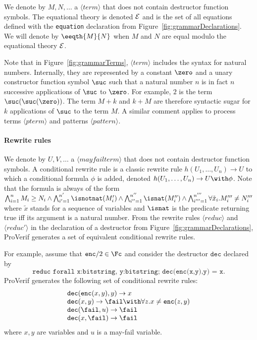 \documentclass{book}
\newcommand{\nonterm}[1]{\langle\mathit{#1}\rangle}
\begin{document}
We denote by $M,N,\ldots$ a $\nonterm{term}$ that does not contain destructor function symbols. The equational theory is denoted $\cal E$ and is the set of all equations defined with the \texttt{equation} declaration from Figure~\ref{fig:grammarDeclarations}. We will denote by $\eeqth{M}{N}$ when $M$ and $N$ are equal modulo the equational theory $\cal E$.

Note that in Figure~\ref{fig:grammarTerms}, $\nonterm{term}$ includes the syntax for natural numbers. Internally, they are represented by a constant $\zero$ and a unary constructor function symbol $\suc$ such that a natural number $n$ is in fact $n$ successive applications of $\suc$ to $\zero$. For example, $2$ is the term $\suc(\suc(\zero))$. The term $M + k$ and $k + M$ are therefore syntactic sugar for $k$ applications of $\suc$ to the term $M$.
A similar comment applies to process terms $\nonterm{pterm}$ and patterns
$\nonterm{pattern}$.

\paragraph{Rewrite rules}

We denote by $U,V,\ldots$ a $\nonterm{mayfailterm}$ that does not contain destructor function symbols. A conditional rewrite rule is a classic rewrite rule $h(U_1,\ldots, U_n) \rightarrow U$ to which a conditional formula $\phi$ is added, denoted $h(U_1,\ldots, U_n) \rightarrow U \with \phi$. Note that the formula is always of the form $\bigwedge_{i=1}^n M_i \geq N_i \wedge \bigwedge_{i'=1}^{n'} \isnotnat(M'_i) \wedge \bigwedge_{i''=1}^{n''} \isnat(M''_i) \wedge \bigwedge_{i'''=1}^{n'''} \forall \tilde{x}_i. M'''_i \neq N'''_i$ where $\tilde{x}$ stands for a sequence of variables and $\isnat$ is the predicate returning true iff its argument is a natural number. From the rewrite rules  $\nonterm{reduc}$ and $\nonterm{reduc'}$ in the declaration of a destructor from Figure~\ref{fig:grammarDeclarations}, ProVerif generates a set of equivalent conditional rewrite rules.

For example, assume that $\texttt{enc}/2 \in \Fc$ and consider the destructor $\texttt{dec}$ declared by
\[
\texttt{reduc forall x:bitstring, y:bitstring; dec(enc(x,y),y) = x.}
\]
ProVerif generates the following set of conditional rewrite rules:
\[
\begin{array}{l}
\texttt{dec}(\texttt{enc}(x,y),y) \rightarrow x\\
\texttt{dec}(x,y) \rightarrow \fail \with \forall z. x \neq \texttt{enc}(z,y)\\
\texttt{dec}(\fail,u) \rightarrow \fail\\
\texttt{dec}(x,\fail) \rightarrow \fail\\
\end{array}
\]
where $x,y$ are variables and $u$ is a may-fail variable.
\end{document}
